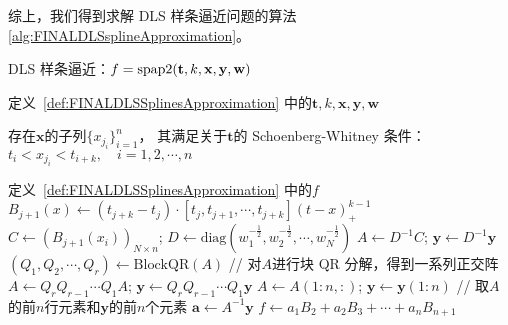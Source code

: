   综上，我们得到求解 DLS 样条逼近问题的算法 \ref{alg:FINALDLSsplineApproximation}。
  \begin{algorithm}[htb]
  \caption{ DLS 样条逼近：$f=\textnormal{spap2}(\mathbf{t}, k, \mathbf{x}, \mathbf{y}, \mathbf{w})$}
  \label{alg:FINALDLSsplineApproximation}
  \begin{algorithmic}[1] 
    \renewcommand{\algorithmicrequire}{ \textbf{Input:}} %
    \REQUIRE  %
    定义~\ref{def:FINALDLSSplinesApproximation} 中的$\mathbf{t}, k, \mathbf{x}, \mathbf{y}, \mathbf{w}$
    
    \renewcommand{\algorithmicrequire}{ \textbf{Preconditions:}} %
    \REQUIRE  %
    存在$\mathbf{x}$的子列$\{x_{j_{i}}\}_{i=1}^{n}$，
    其满足关于$\mathbf{t}$的 Schoenberg-Whitney 条件：\\
     $t_{i}<x_{j_{i}}<t_{i+k},\quad i=1,2,\cdots,n$
      
    \renewcommand{\algorithmicensure}{ \textbf{Output:}} %
    \ENSURE  %
    定义~\ref{def:FINALDLSSplinesApproximation} 中的$f$
    \renewcommand{\algorithmicensure}{ \textbf{Postconditions:}} %
    \STATE $B_{j+1}(x)\leftarrow (t_{j+k}-t_{j})\cdot [t_{j},t_{j+1},\cdots,t_{j+k}](t-x)_{+}^{k-1}$
    \ENDFOR
    \STATE $C\leftarrow (B_{j+1}(x_{i}))_{N\times n}$;
    $D\leftarrow \text{diag}(w_{1}^{-\frac{1}{2}},w_{2}^{-\frac{1}{2}},\cdots, w_{N}^{-\frac{1}{2}})$
    \STATE $A\leftarrow D^{-1}C$; $\mathbf{y}\leftarrow D^{-1}\mathbf{y}$
    \STATE $({Q}_{1},{Q}_{2},\cdots,{Q}_{r})\leftarrow \text{BlockQR}(A)$
    \hfill
      // 对$A$进行块 QR 分解，得到一系列正交阵
    \STATE $A\leftarrow {Q}_r{Q}_{r-1} \cdots {Q}_1 A$;
    $\mathbf{y}\leftarrow {Q}_r{Q}_{r-1} \cdots {Q}_1\mathbf{y}$
    \STATE $A\leftarrow A(1:n,:)$; $\mathbf{y}\leftarrow \mathbf{y}(1:n)$
    \hfill
      // 取$A$的前$n$行元素和$\mathbf{y}$的前$n$个元素
    \STATE $\mathbf{a}\leftarrow A^{-1}\mathbf{y}$
    \STATE $f\leftarrow a_{1}B_{2}+a_{2}B_{3}+\cdots+a_{n}B_{n+1}$
  \end{algorithmic}
  \end{algorithm}
